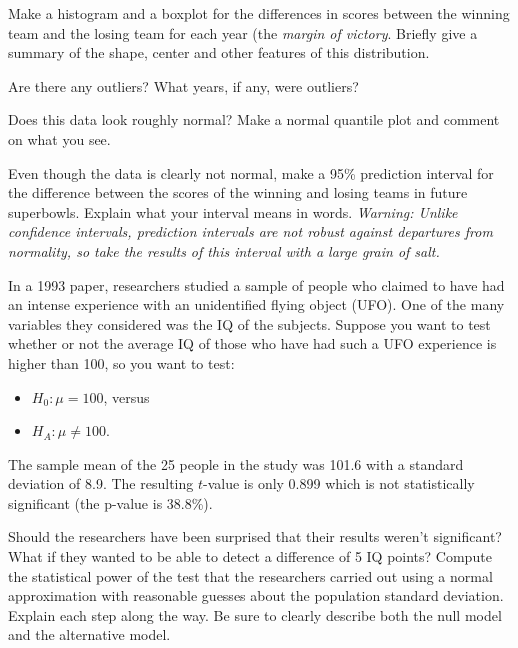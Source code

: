 \documentclass[11pt]{exam}
\begin{document}
\begin{questions}
\begin{parts}
\item Make a histogram and a boxplot for the differences in scores between the winning team and the losing team for each year (the \textit{margin of victory}.  Briefly give a summary of the shape, center and other features of this distribution.

\item Are there any outliers?  What years, if any, were outliers?  

\item Does this data look roughly normal? Make a normal quantile plot and comment on what you see. 


\item Even though the data is clearly not normal, make a 95\% prediction interval for the difference between the scores of the winning and losing teams in future superbowls. Explain what your interval means in words.   \textit{Warning: Unlike confidence intervals, prediction intervals are not robust against departures from normality, so take the results of this interval with a large grain of salt. }
\end{parts}


\question In a 1993 paper, researchers studied a sample of people who claimed to have had an intense experience with an unidentified flying object (UFO).  One of the many variables they considered was the IQ of the subjects.  Suppose you want to test whether or not the average IQ of those who have had such a UFO experience is higher than 100, so you want to test:
\begin{itemize}
\item $H_0: \mu = 100$, versus
\item $H_A: \mu \ne 100$.  
\end{itemize}
The sample mean of the 25 people in the study was 101.6 with a standard deviation of 8.9. The resulting $t$-value is only 0.899 which is not statistically significant (the p-value is 38.8\%).

Should the researchers have been surprised that their results weren't significant?  What if they wanted to be able to detect a difference of 5 IQ points?  Compute the statistical power of the test that the researchers carried out using a normal approximation with reasonable guesses about the population standard deviation.  Explain each step along the way.  Be sure to clearly describe both the null model and the alternative model. 
\end{questions}
\end{document}
